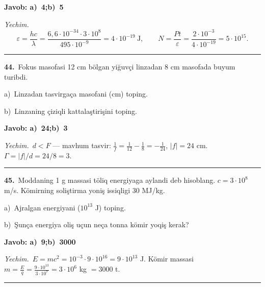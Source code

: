 \documentclass[11pt,a4paper]{article}
\begin{document}
\noindent\colorbox{gray!12}{\parbox{\dimexpr\linewidth-2\fboxsep}{\textbf{Javob: a)\ 4;\quad b)\ 5}}}\par\smallskip
\noindent\textit{Yechim.}\ \[\varepsilon=\frac{hc}{\lambda}=\frac{6{,}6\cdot10^{-34}\cdot3\cdot10^8}{495\cdot10^{-9}}=4\cdot10^{-19}\ \text{J},\qquad N=\frac{Pt}{\varepsilon}=\frac{2\cdot10^{-3}}{4\cdot10^{-19}}=5\cdot10^{15}.\]\par\medskip\hrule\medskip
{}\noindent\textbf{44.}\ Fokus masofasi 12 cm bölgan yiğuvçi linzadan 8 cm masofada buyum turibdi.\par
\noindent\hspace*{4mm}a)\ Linzadan tasvirgaça masofani (cm) toping.\par
\noindent\hspace*{4mm}b)\ Linzaning çiziqli kattalaştirişini toping.\par
\noindent\colorbox{gray!12}{\parbox{\dimexpr\linewidth-2\fboxsep}{\textbf{Javob: a)\ 24;\quad b)\ 3}}}\par\smallskip
\noindent\textit{Yechim.}\ $d<F$ — mavhum tasvir: $\frac1f=\frac1{12}-\frac18=-\frac1{24}$, $|f|=24$ cm. $\Gamma=|f|/d=24/8=3$.\par\par\medskip\hrule\medskip
{}\noindent\textbf{45.}\ Moddaning 1 g massasi töliq energiyaga aylandi deb hisoblang. $c=3\cdot10^8$ m/s. Kömirning soliştirma yoniş issiqligi 30 MJ/kg.\par
\noindent\hspace*{4mm}a)\ Ajralgan energiyani ($10^{13}$ J) toping.\par
\noindent\hspace*{4mm}b)\ Şunça energiya oliş uçun neça tonna kömir yoqiş kerak?\par
\noindent\colorbox{gray!12}{\parbox{\dimexpr\linewidth-2\fboxsep}{\textbf{Javob: a)\ 9;\quad b)\ 3000}}}\par\smallskip
\noindent\textit{Yechim.}\ $E=mc^2=10^{-3}\cdot9\cdot10^{16}=9\cdot10^{13}$ J. Kömir massasi $m=\frac{E}{q}=\frac{9\cdot10^{13}}{3\cdot10^7}=3\cdot10^6$ kg $=3000$ t.\par\par\medskip\hrule\medskip
\end{document}
